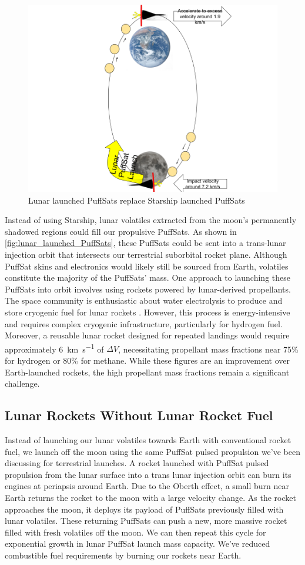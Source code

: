 \documentclass{article}
\begin{document}
{\begin{figure}[htbp]
    \centering
    \includegraphics[width=0.5\linewidth]{images/Water Drawing From Moon.png}
    \caption{Lunar launched PuffSats replace Starship launched PuffSats \cite{earth_image} \cite{moon_image}}
    \label{fig:lunar_launched_PuffSats}
\end{figure}
Instead of using Starship, lunar volatiles extracted from the moon's permanently shadowed regions could fill our propulsive PuffSats. As shown in \autoref{fig:lunar_launched_PuffSats}, these PuffSats could be sent into a trans-lunar injection orbit that intersects our terrestrial suborbital rocket plane. Although PuffSat skins and electronics would likely still be sourced from Earth, volatiles constitute the majority of the PuffSats' mass. One approach to launching these PuffSats into orbit involves using rockets powered by lunar-derived propellants. The space community is enthusiastic about water electrolysis to produce and store cryogenic fuel for lunar rockets \cite{nasa_water}. However, this process is energy-intensive and requires complex cryogenic infrastructure, particularly for hydrogen fuel. Moreover, a reusable lunar rocket designed for repeated landings would require approximately \SI{6}{\km\per\second} of $\Delta V$, necessitating propellant mass fractions near 75\% for hydrogen or 80\% for methane. While these figures are an improvement over Earth-launched rockets, the high propellant mass fractions remain a significant challenge.   

\subsection{Lunar Rockets Without Lunar Rocket Fuel} \label{sec:lunar_rockets_no_fuel}
Instead of launching our lunar volatiles towards Earth with conventional rocket fuel, we launch off the moon using the same PuffSat pulsed propulsion we've been discussing for terrestrial launches.   A rocket launched with PuffSat pulsed propulsion from the lunar surface into a trans lunar injection orbit can burn its engines at periapsis around Earth.  Due to the Oberth effect, a small burn near Earth returns the rocket to the moon with a large velocity change.  As the rocket approaches the moon, it deploys its payload of PuffSats previously filled with lunar volatiles.  These returning PuffSats can push a new, more massive rocket filled with fresh volatiles off the moon.   We can then repeat this  cycle for exponential growth in lunar PuffSat launch mass capacity.   We've reduced combustible fuel requirements by burning our rockets near Earth.


}
\end{document}
